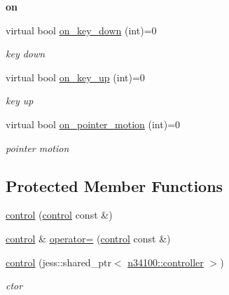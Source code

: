 \begin{Indent}{\bf on}\par
{\em \label{_amgrped2b5c0139cec8ad2873829dc1117d50}
 }\begin{DoxyCompactItemize}
\item 
virtual bool \hyperlink{classnebula_1_1content_1_1actor_1_1admin_1_1controller_1_1control_a7293da4d566696cef20a6c38cc718ec7}{on\_\-key\_\-down} (int)=0
\begin{DoxyCompactList}\small\item\em key down \item\end{DoxyCompactList}\item 
virtual bool \hyperlink{classnebula_1_1content_1_1actor_1_1admin_1_1controller_1_1control_ad8f985adf1dd2cf49f2643796754c9c7}{on\_\-key\_\-up} (int)=0
\begin{DoxyCompactList}\small\item\em key up \item\end{DoxyCompactList}\item 
virtual bool \hyperlink{classnebula_1_1content_1_1actor_1_1admin_1_1controller_1_1control_af5dda210df101e72817d807a1ea0fc82}{on\_\-pointer\_\-motion} (int)=0
\begin{DoxyCompactList}\small\item\em pointer motion \item\end{DoxyCompactList}\end{DoxyCompactItemize}
\end{Indent}
\subsection*{Protected Member Functions}
\begin{DoxyCompactItemize}
\item 
\hyperlink{classnebula_1_1content_1_1actor_1_1admin_1_1controller_1_1control_aae149423fa937bba3a4e4f884e0bd496}{control} (\hyperlink{classnebula_1_1content_1_1actor_1_1admin_1_1controller_1_1control}{control} const \&)
\item 
\hyperlink{classnebula_1_1content_1_1actor_1_1admin_1_1controller_1_1control}{control} \& \hyperlink{classnebula_1_1content_1_1actor_1_1admin_1_1controller_1_1control_a11020fb3848201c6b53f0be03e042d85}{operator=} (\hyperlink{classnebula_1_1content_1_1actor_1_1admin_1_1controller_1_1control}{control} const \&)
\item 
\hyperlink{classnebula_1_1content_1_1actor_1_1admin_1_1controller_1_1control_a6a7047e33948c6ca81008c3fab59d260}{control} (jess::shared\_\-ptr$<$ \hyperlink{classnebula_1_1content_1_1actor_1_1admin_1_1controller}{n34100::controller} $>$)
\begin{DoxyCompactList}\small\item\em ctor \item\end{DoxyCompactList}\end{DoxyCompactItemize}

